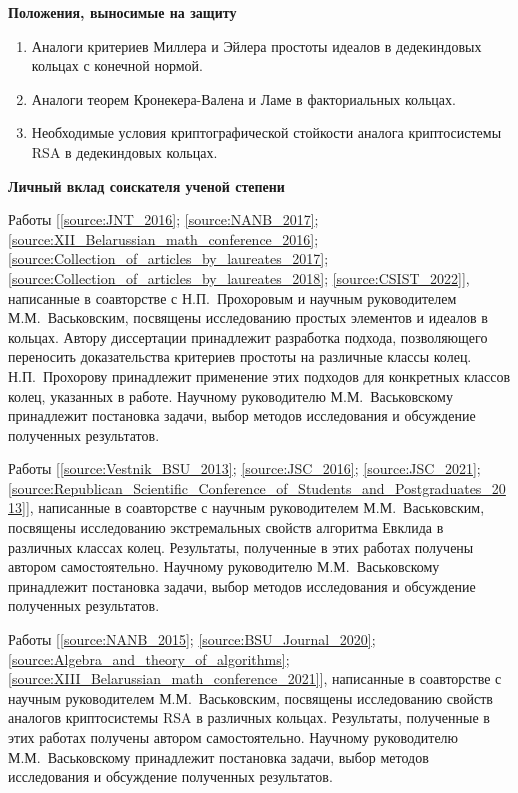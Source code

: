 \documentclass[_00_dissertation.tex]{subfiles}
\begin{document}
\begin{center}
\textbf{Положения, выносимые на защиту}
\end{center}

\begin{enumerate}
    \item Аналоги критериев Миллера и Эйлера простоты идеалов в дедекиндовых кольцах с конечной нормой.
    
    \item Аналоги теорем Кронекера-Валена и Ламе в факториальных кольцах.
    
    \item Необходимые условия криптографической стойкости аналога криптосистемы RSA в дедекиндовых кольцах.
\end{enumerate}

\begin{center}
\textbf{Личный вклад соискателя ученой степени}
\end{center}

Работы [\ref{source:JNT_2016}; \ref{source:NANB_2017}; \ref{source:XII_Belarussian_math_conference_2016}; \ref{source:Collection_of_articles_by_laureates_2017}; \ref{source:Collection_of_articles_by_laureates_2018}; \ref{source:CSIST_2022}], написанные в соавторстве с Н.П.~Прохоровым и научным руководителем М.М.~Васьковским, посвящены исследованию простых элементов и идеалов в кольцах.
Автору диссертации принадлежит разработка подхода, позволяющего переносить доказательства критериев простоты на различные классы колец.
Н.П.~Прохорову принадлежит применение этих подходов для конкретных классов колец, указанных в работе.
Научному руководителю М.М.~Васьковскому принадлежит постановка задачи, выбор методов исследования и обсуждение полученных результатов.

Работы [\ref{source:Vestnik_BSU_2013}; \ref{source:JSC_2016}; \ref{source:JSC_2021}; \ref{source:Republican_Scientific_Conference_of_Students_and_Postgraduates_2013}], написанные в соавторстве с научным руководителем М.М.~Васьковским, посвящены исследованию экстремальных свойств алгоритма Евклида в различных  классах колец.
Результаты, полученные  в этих работах получены  автором самостоятельно.
Научному руководителю М.М.~Васьковскому принадлежит постановка задачи, выбор методов исследования и обсуждение полученных результатов.

Работы [\ref{source:NANB_2015}; \ref{source:BSU_Journal_2020}; \ref{source:Algebra_and_theory_of_algorithms}; \ref{source:XIII_Belarussian_math_conference_2021}], написанные в соавторстве с научным руководителем М.М.~Васьковским, посвящены исследованию свойств аналогов криптосистемы RSA в различных кольцах.
Результаты, полученные  в этих работах получены  автором самостоятельно.
Научному руководителю М.М.~Васьковскому принадлежит постановка задачи, выбор методов исследования и обсуждение полученных результатов.
\end{document}
